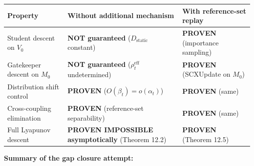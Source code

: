 \documentclass[
  12pt,
]{article}
\begin{document}
\begin{longtable}[]{@{}
  >{\raggedright\arraybackslash}p{}
  >{\raggedright\arraybackslash}p{}
  >{\raggedright\arraybackslash}p{}@{}}
\toprule\noalign{}
\begin{minipage}[b]{\linewidth}\raggedright
Property
\end{minipage} & \begin{minipage}[b]{\linewidth}\raggedright
Without additional mechanism
\end{minipage} & \begin{minipage}[b]{\linewidth}\raggedright
With reference-set replay
\end{minipage} \\
\midrule\noalign{}
\endhead
\bottomrule\noalign{}
\endlastfoot
Student descent on \(V_0\) & \textbf{NOT guaranteed}
(\(D_{\text{static}}\) constant) & \textbf{PROVEN} (importance
sampling) \\
Gatekeeper descent on \(M_0\) & \textbf{NOT guaranteed}
(\(\rho_t^{\text{eff}}\) undetermined) & \textbf{PROVEN} (SCXUpdate on
\(M_0\)) \\
Distribution shift control & \textbf{PROVEN}
(\(O(\beta_t) = o(\alpha_t)\)) & \textbf{PROVEN} (same) \\
Cross-coupling elimination & \textbf{PROVEN} (reference-set
separability) & \textbf{PROVEN} (same) \\
Full Lyapunov descent & \textbf{PROVEN IMPOSSIBLE asymptotically}
(Theorem 12.2) & \textbf{PROVEN} (Theorem 12.5) \\
\end{longtable}

\textbf{Summary of the gap closure attempt:}
\end{document}
